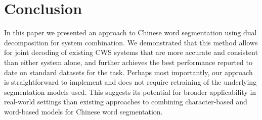 \section{Conclusion}

In this paper we presented an approach to Chinese word segmentation using dual decomposition for system combination. We demonstrated that this method allows for joint decoding of existing CWS systems that are more accurate and consistent than either system alone, and further achieves the best performance reported to date on standard datasets for the task.
Perhaps most importantly, our approach is straightforward to implement and does not require retraining of the underlying segmentation models used. This suggests its potential for broader applicability in real-world settings than existing approaches to combining character-based and word-based models for Chinese word segmentation.